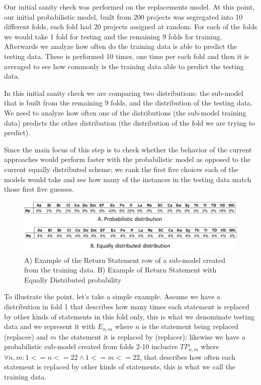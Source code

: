 \documentclass[conference]{IEEEtran}
\begin{document}
Our initial sanity check was performed on the replacements model. At this point, 
our initial probabilistic model, built from 200 projects was segregated into 10 
different folds, each fold had 20 projects assigned at random. For each of the 
folds we would take 1 fold for testing and the remaining 9 folds for training. 
Afterwards we analyze how often do the training data is able to predict the 
testing data. These is performed 10 times, one time per each fold and then it is 
averaged to see how commonly is the training data able to predict the testing 
data.

In this initial sanity check we are comparing two distributions: the sub-model 
that is built from the remaining 9 folds, and the distribution of the testing 
data. We need to analyze how often one of the distributions (the sub-model 
training data) predicts the other distribution (the distribution of the fold we 
are trying to predict). 

Since the main focus of this step is to check whether the behavior of the 
current approaches would perform faster with the probabilistic model as opposed 
to the current equally distributed scheme; we rank the first five choices each 
of the models would take and see how many of the instances in the testing data 
match those first five guesses.

\begin{figure}[!h]
  \centering
    \includegraphics[scale=0.25]{sanity5}
  \caption{A) Example of the Return Statement row of a sub-model created from 
the 
training data. B) Example of Return Statement with Equally Distributed 
probability}
  \label{fig:exPredReturn}
\end{figure}

To illustrate the point, let's take a simple example. Assume we have a 
distribution in fold 1 that describes how many times each statement is replaced 
by other kinds of statements in this fold 
only, this is what we denominate testing data and we represent it with $E_{n,m}$ 
where $n$ is the statement being replaced (replacee) and $m$ the statement it is 
replaced by (replacer); likewise we have a probabilistic sub-model created from 
folds 2-10 inclusive $TP_{n,m}$ where $\forall n,m: 1<=n<=22 \land 1<=m<=22$, 
that describes how often each statement is replaced by 
other kinds of statements, this is what we call the training data. 
\end{document}

